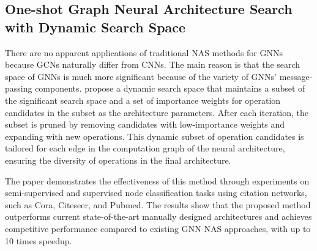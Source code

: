 \subsection{One-shot Graph Neural Architecture Search with Dynamic Search Space}

There are no apparent applications of traditional NAS methods for GNNs because GCNs naturally differ from CNNs. The main reason is that the search space of GNNs is much more significant because of the variety of GNNs' message-passing components. \cite{li2021one} propose a dynamic search space that maintains a subset of the significant search space and a set of importance weights for operation candidates in the subset as the architecture parameters. After each iteration, the subset is pruned by removing candidates with low-importance weights and expanding with new operations. This dynamic subset of operation candidates is tailored for each edge in the computation graph of the neural architecture, ensuring the diversity of operations in the final architecture. 

The paper demonstrates the effectiveness of this method through experiments on semi-supervised and supervised node classification tasks using citation networks, such as Cora, Citeseer, and Pubmed. The results show that the proposed method outperforms current state-of-the-art manually designed architectures and achieves competitive performance compared to existing GNN NAS approaches, with up to 10 times speedup.